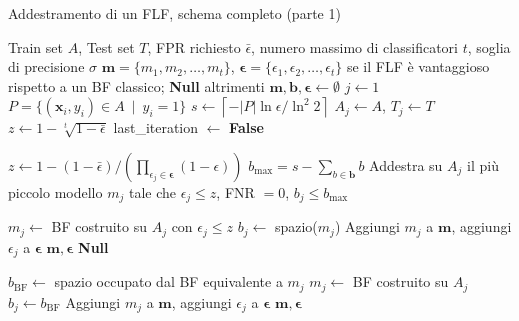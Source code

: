 \begin{algorithm}[ht]
\caption{Addestramento di un FLF, schema completo (parte 1)}
\begin{algorithmic}[1]
    \Require Train set $A$, Test set $T$, FPR richiesto $\bar \epsilon$, numero massimo di classificatori $t$, soglia di precisione $\sigma$
    \Ensure $\mathbf{m} = \{m_1, m_2, \dots, m_t \}$, $\boldsymbol{\epsilon} = \{\epsilon_1, \epsilon_2, \dots, \epsilon_t \}$ se il FLF è vantaggioso rispetto a un BF classico; \textbf{Null} altrimenti
    \State $\mathbf{m}, \mathbf{b}, \boldsymbol{\epsilon} \gets \emptyset$
    \State $j \gets 1$
    \State $P = \{(\mathbf{x}_i, y_i) \in A \enspace | \enspace y_i = 1 \}$
    \State $s \gets \left\lceil - |P|\ln{\epsilon}/\ln^2 2 \right\rceil$
    \State $A_j \gets A$, $T_j \gets T$
    \State $z \gets 1 - \sqrt[t]{1-\bar \epsilon}$
    \State last\_iteration $\gets$ \textbf{False}
    
                \State $z \gets 1- (1- \bar \epsilon)/(\prod_{\epsilon_j \in \boldsymbol{\epsilon}}(1-\epsilon))$
            \EndIf
            \State $b_{\text{max}} = s - \sum_{b \in \mathbf{b}} b$
            \State Addestra su $A_j$ il più piccolo modello $m_j$ tale che $\epsilon_j \leq z$, FNR $=0$, $b_j \leq b_{\text{max}}$
            
                \State {}
                \State $m_j \gets$ BF costruito su $A_j$ con $\epsilon_j \leq z$
                \State $b_j \gets$ spazio($m_j$)
                    \State Aggiungi $m_j$ a $\mathbf{m}$, aggiungi $\epsilon_j$ a $\boldsymbol{\epsilon}$ 
                    \State \Return $\mathbf{m}, \boldsymbol{\epsilon}$
                \Else
                    \State \Return \textbf{Null} 
                \EndIf
                
            \Else

                \State $b_{\text{BF}} \gets$ spazio occupato dal BF equivalente a $m_j$
                    \State $m_j \gets$ BF costruito su $A_j$ 
                    \State $b_j \gets b_{\text{BF}}$
                \EndIf
                \State Aggiungi $m_j$ a $\mathbf{m}$, aggiungi $\epsilon_j$ a $\boldsymbol{\epsilon}$
                \State \Return $\mathbf{m}, \boldsymbol{\epsilon}$
            
            \EndIf
        
\end{algorithmic}
\label{alg:addestramento-catena-completo-1}
\end{algorithm}

